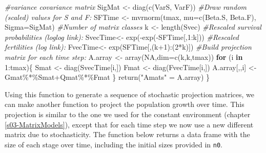 \documentclass[
]{book}
\newenvironment{Shaded}{\begin{snugshade}}{\end{snugshade}}
\newcommand{\AttributeTok}[1]{\textcolor[rgb]{0.77,0.63,0.00}{#1}}
\newcommand{\CommentTok}[1]{\textcolor[rgb]{0.56,0.35,0.01}{\textit{#1}}}
\newcommand{\ConstantTok}[1]{\textcolor[rgb]{0.00,0.00,0.00}{#1}}
\newcommand{\ControlFlowTok}[1]{\textcolor[rgb]{0.13,0.29,0.53}{\textbf{#1}}}
\newcommand{\DecValTok}[1]{\textcolor[rgb]{0.00,0.00,0.81}{#1}}
\newcommand{\FunctionTok}[1]{\textcolor[rgb]{0.00,0.00,0.00}{#1}}
\newcommand{\NormalTok}[1]{#1}
\newcommand{\OtherTok}[1]{\textcolor[rgb]{0.56,0.35,0.01}{#1}}
\newcommand{\SpecialCharTok}[1]{\textcolor[rgb]{0.00,0.00,0.00}{#1}}
\newcommand{\StringTok}[1]{\textcolor[rgb]{0.31,0.60,0.02}{#1}}
\begin{document}
\begin{Shaded}
\begin{Highlighting}[]
  \CommentTok{\#variance covariance matrix }
\NormalTok{  SigMat }\OtherTok{\textless{}{-}} \FunctionTok{diag}\NormalTok{(}\FunctionTok{c}\NormalTok{(VarS, VarF))}
  \CommentTok{\#Draw random (scaled) values for S and F:}
\NormalTok{  SFTime }\OtherTok{\textless{}{-}} \FunctionTok{mvrnorm}\NormalTok{(tmax, }\AttributeTok{mu=}\FunctionTok{c}\NormalTok{(Beta.S, Beta.F), }\AttributeTok{Sigma=}\NormalTok{SigMat)}
  \CommentTok{\#Number of matrix classes }
\NormalTok{  k }\OtherTok{\textless{}{-}} \FunctionTok{length}\NormalTok{(Svec) }
  \CommentTok{\#Rescaled survival probabilities (loglog link):}
\NormalTok{  SvecTime}\OtherTok{\textless{}{-}}   \FunctionTok{exp}\NormalTok{(}\SpecialCharTok{{-}}\FunctionTok{exp}\NormalTok{(}\SpecialCharTok{{-}}\NormalTok{SFTime[,}\DecValTok{1}\SpecialCharTok{:}\NormalTok{k])) }
  \CommentTok{\#Rescaled fertilities  (log link):}
\NormalTok{  FvecTime}\OtherTok{\textless{}{-}} \FunctionTok{exp}\NormalTok{(SFTime[,(k}\SpecialCharTok{+}\DecValTok{1}\NormalTok{)}\SpecialCharTok{:}\NormalTok{(}\DecValTok{2}\SpecialCharTok{*}\NormalTok{k)]) }
\CommentTok{\#Build  projection matrix for each time step:}
\NormalTok{  A.array }\OtherTok{\textless{}{-}} \FunctionTok{array}\NormalTok{(}\ConstantTok{NA}\NormalTok{,}\AttributeTok{dim=}\FunctionTok{c}\NormalTok{(k,k,tmax))}
  \ControlFlowTok{for}\NormalTok{ (i }\ControlFlowTok{in} \DecValTok{1}\SpecialCharTok{:}\NormalTok{tmax)\{}
\NormalTok{    Smat }\OtherTok{\textless{}{-}} \FunctionTok{diag}\NormalTok{(SvecTime[i,])}
\NormalTok{    Fmat }\OtherTok{\textless{}{-}} \FunctionTok{diag}\NormalTok{(FvecTime[i,])}
\NormalTok{    A.array[,,i] }\OtherTok{\textless{}{-}}\NormalTok{   Gmat}\SpecialCharTok{\%*\%}\NormalTok{Smat}\SpecialCharTok{+}\NormalTok{Qmat}\SpecialCharTok{\%*\%}\NormalTok{Fmat}
\NormalTok{  \}}
\FunctionTok{return}\NormalTok{(}\StringTok{"Amats"} \OtherTok{=}\NormalTok{ A.array)}
\NormalTok{\}}
\end{Highlighting}
\end{Shaded}

Using this function to generate a sequence of stochastic projection matrices, we can make another function to project the population growth over time. This projection is similar to the one we used for the constant environment (chapter \ref{s03-MatrixModels}), except that for each time step we now use a new different matrix due to stochasticity. The function below returns a data frame with the size of each stage over time, including the initial sizes provided in \texttt{n0}.
\end{document}
